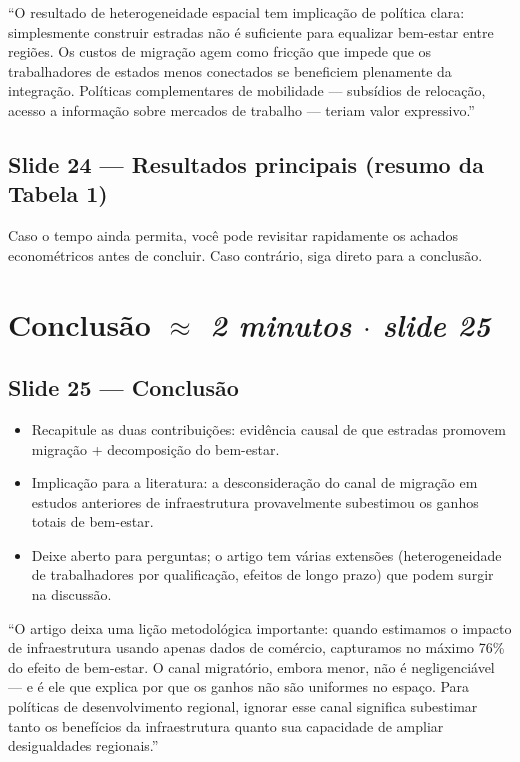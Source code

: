 \documentclass[12pt, a4paper]{article}
\begin{document}
\begin{mdframed}[style=sintese]
``O resultado de heterogeneidade espacial tem implicação de política clara: simplesmente
construir estradas não é suficiente para equalizar bem-estar entre regiões. Os custos
de migração agem como fricção que impede que os trabalhadores de estados menos conectados
se beneficiem plenamente da integração. Políticas complementares de mobilidade --- subsídios
de relocação, acesso a informação sobre mercados de trabalho --- teriam valor expressivo.''
\end{mdframed}

\subsection*{Slide 24 --- Resultados principais (resumo da Tabela 1)}

Caso o tempo ainda permita, você pode revisitar rapidamente os achados econométricos antes de concluir. Caso contrário, siga direto para a conclusão.

\vspace{0.3cm}

\section{Conclusão \hfill \normalfont\small\textit{$\approx$ 2 minutos $\cdot$ slide 25}}

\subsection*{Slide 25 --- Conclusão}

\begin{itemize}
    \item Recapitule as duas contribuições: evidência causal de que estradas promovem migração + decomposição do bem-estar.
    \item Implicação para a literatura: a desconsideração do canal de migração em estudos anteriores de infraestrutura provavelmente subestimou os ganhos totais de bem-estar.
    \item Deixe aberto para perguntas; o artigo tem várias extensões (heterogeneidade de trabalhadores por qualificação, efeitos de longo prazo) que podem surgir na discussão.
\end{itemize}

\begin{mdframed}[style=sintese]
``O artigo deixa uma lição metodológica importante: quando estimamos o impacto de infraestrutura
usando apenas dados de comércio, capturamos no máximo 76\% do efeito de bem-estar. O canal
migratório, embora menor, não é negligenciável --- e é ele que explica por que os ganhos não
são uniformes no espaço. Para políticas de desenvolvimento regional, ignorar esse canal significa
subestimar tanto os benefícios da infraestrutura quanto sua capacidade de ampliar desigualdades regionais.''
\end{mdframed}
\end{document}
